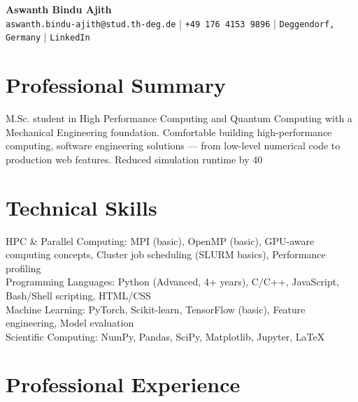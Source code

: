 \documentclass[11pt,a4paper]{article}
\begin{document}
\begin{center}
    {\LARGE\bfseries Aswanth Bindu Ajith}\\[4pt]
    \texttt{aswanth.bindu-ajith@stud.th-deg.de} | \texttt{+49 176 4153 9896} | \texttt{Deggendorf, Germany} | \texttt{LinkedIn}
\end{center}

\section{Professional Summary}
M.Sc. student in High Performance Computing and Quantum Computing with a Mechanical Engineering foundation. Comfortable building high-performance computing, software engineering solutions — from low-level numerical code to production web features. Reduced simulation runtime by 40%

\section{Technical Skills}

HPC & Parallel Computing: MPI (basic), OpenMP (basic), GPU-aware computing concepts, Cluster job scheduling (SLURM basics), Performance profiling\\

Programming Languages: Python (Advanced, 4+ years), C/C++, JavaScript, Bash/Shell scripting, HTML/CSS\\

Machine Learning: PyTorch, Scikit-learn, TensorFlow (basic), Feature engineering, Model evaluation\\

Scientific Computing: NumPy, Pandas, SciPy, Matplotlib, Jupyter, LaTeX


\section{Professional Experience}
\end{document}
